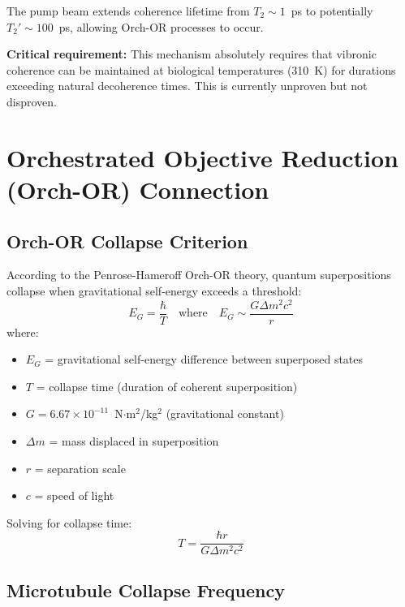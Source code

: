 The pump beam extends coherence lifetime from $T_2 \sim 1$~ps to potentially $T_2' \sim 100$~ps, allowing Orch-OR processes to occur.

\begin{warningbox}
\textbf{Critical requirement:} This mechanism absolutely requires that vibronic coherence can be maintained at biological temperatures (310~K) for durations exceeding natural decoherence times. This is currently unproven but not disproven.
\end{warningbox}

\section{Orchestrated Objective Reduction (Orch-OR) Connection}

\subsection{Orch-OR Collapse Criterion}

According to the Penrose-Hameroff Orch-OR theory, quantum superpositions collapse when gravitational self-energy exceeds a threshold:
\begin{equation}
E_G = \frac{\hbar}{T} \quad\text{where}\quad E_G \sim \frac{G\Delta m^2 c^2}{r}
\label{eq:orch-or-criterion}
\end{equation}
where:
\begin{itemize}
\item $E_G$ = gravitational self-energy difference between superposed states
\item $T$ = collapse time (duration of coherent superposition)
\item $G = 6.67 \times 10^{-11}$~N$\cdot$m$^2$/kg$^2$ (gravitational constant)
\item $\Delta m$ = mass displaced in superposition
\item $r$ = separation scale
\item $c$ = speed of light
\end{itemize}

Solving for collapse time:
\begin{equation}
T = \frac{\hbar r}{G\Delta m^2 c^2}
\label{eq:collapse-time}
\end{equation}

\subsection{Microtubule Collapse Frequency}

